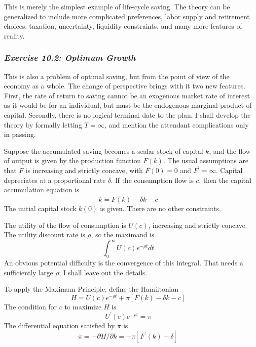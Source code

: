 This is merely the simplest example of life-cycle saving. The theory can be generalized to include more complicated preferences, labor supply and retirement choices, taxation, uncertainty, liquidity constraints, and many more features of reality.

\subsubsection*{\textit{Exercise 10.2: Optimum Growth}}

This is also a problem of optimal saving, but from the point of view of the economy as a whole. The change of perspective brings with it two new features. First, the rate of return to saving cannot be an exogenous market rate of interest as it would be for an individual, but must be the endogenous marginal product of capital. Secondly, there is no logical terminal date to the plan. I shall develop the theory by formally letting $T =\infty$, and mention the attendant complications only in passing.

Suppose the accumulated saving becomes a scalar stock of capital $k$, and the flow of output is given by the production function $F(k)$. The usual assumptions are that $F$ is increasing and strictly concave, with $F(0)=0$ and $F^\prime = \infty$. Capital depreciates at a proportional rate $\delta$. If the consumption flow is $c$, then the capital accumulation equation is 
\begin{equation} \label{equa10.32}
\dot{k} = F(k) - \delta k - c
\end{equation}
The initial capital stock $k(0)$ is given. There are no other constraints.

The utility of the flow of consumption is $U(c)$, increasing and strictly concave. The utility discount rate is $\rho$, so the maximand is 
\begin{equation*}
 \int_0^\infty U(c) e^{-\rho t} dt
\end{equation*}
An obvious potential difficulty is the convergence of this integral. That needs a sufficiently large $\rho$; I shall leave out the details.

To apply the Maximum Principle, define the Hamiltonian
\begin{equation*}
H = U(c) e^{-\rho t} + \pi [F(k) - \delta k -c]
\end{equation*}
The condition for $c$ to maximize $H$ is
\begin{equation} \label{equa10.33}
 U^\prime (c) e^{-\rho t} = \pi
\end{equation}
The differential equation satisfied by $\pi$ is 
\begin{equation} \label{equa10.34}
 \dot{\pi} = - \partial H / \partial k = - \pi [F^\prime(k) - \delta]
\end{equation}

